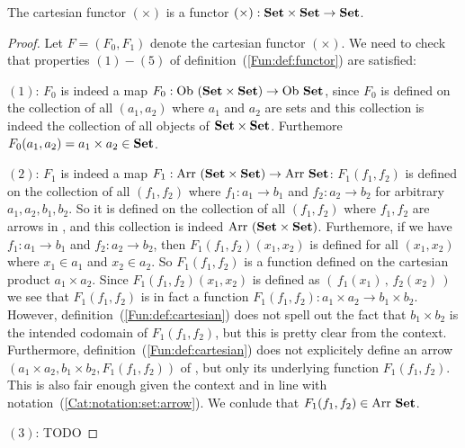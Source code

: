 \begin{prop}\label{Fun:prop:cartesian}
    The cartesian functor $(\times)$ is a functor $(\times):\mbox{\bf Set}\times\mbox{\bf Set}
    \to\mbox{\bf Set}$. 
\end{prop}
\begin{proof}
    Let $F=(F_{0},F_{1})$ denote the cartesian functor $(\times)$. We need
    to check that properties $(1)-(5)$ of definition~(\ref{Fun:def:functor}) 
    are satisfied:

    $(1)$: $F_{0}$ is indeed a map $F_{0}:\ob\ (\Set\times\Set)\to\ob\ \Set$, 
    since $F_{0}$ is defined on the collection of all $(a_{1},a_{2})$ where
    $a_{1}$ and $a_{2}$ are sets and this collection is indeed the collection
    of all objects of $\mbox{\bf Set}\times\mbox{\bf Set}$. Furthemore $F_{0}(a_{1},a_{2})=
    a_{1}\times a_{2}\in\mbox{\bf Set}$.

    $(2)$: $F_{1}$ is indeed a map $F_{1}:\arr\ (\Set\times\Set)\to\arr\ \Set$:
    $F_{1}(f_{1},f_{2})$ is defined on the collection of all $(f_{1},f_{2})$
    where $f_{1}:a_{1}\to b_{1}$ and $f_{2}:a_{2}\to b_{2}$ for arbitrary
    $a_{1}, a_{2}, b_{1}, b_{2}$. So it is defined on the collection of all
    $(f_{1},f_{2})$ where $f_{1},f_{2}$ are arrows in \Set, and this collection
    is indeed $\mbox{\rm Arr}\ (\mbox{\bf Set}\times\mbox{\bf Set})$. Furthemore, if we have $f_{1}:a_{1}\to 
    b_{1}$ and $f_{2}:a_{2}\to b_{2}$, then $F_{1}(f_{1},f_{2})(x_{1},x_{2})$ is 
    defined for all $(x_{1},x_{2})$ where $x_{1}\in a_{1}$ and $x_{2}\in a_{2}$.
    So $F_{1}(f_{1},f_{2})$ is a function defined on the 
    cartesian product $a_{1}\times a_{2}$. Since $F_{1}(f_{1},f_{2})(x_{1},x_{2})$
    is defined as $(\,f_{1}(x_{1})\,,\,f_{2}(x_{2})\,)$ we see that $F_{1}
    (f_{1},f_{2})$ is in fact a function $F_{1}(f_{1},f_{2}):a_{1}\times a_{2}
    \to b_{1}\times b_{2}$. However, definition~(\ref{Fun:def:cartesian}) does
    not spell out the fact that $b_{1}\times b_{2}$ is the intended codomain
    of $F_{1}(f_{1},f_{2})$, but this is pretty clear from the context.
    Furthermore, definition~(\ref{Fun:def:cartesian}) does not explicitely 
    define an arrow $(a_{1}\times a_{2},b_{1}\times b_{2},F_{1}(f_{1},f_{2}))$ of 
    \Set, but only its underlying function $F_{1}(f_{1},f_{2})$. This is also 
    fair enough given the context and in line with 
    notation~(\ref{Cat:notation:set:arrow}). We conlude that $F_{1}(f_{1},f_{2})
    \in\mbox{\rm Arr}\ \mbox{\bf Set}$.

    $(3)$: TODO
\end{proof}

